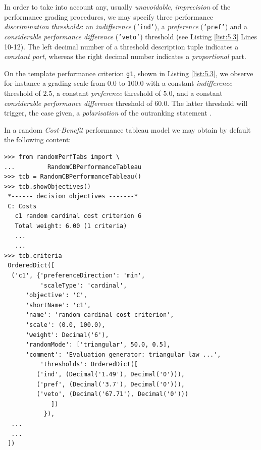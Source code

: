 In order to take into account any, usually \emph{unavoidable}, \emph{imprecision} of the performance grading procedures, we may specify three performance \emph{discrimination thresholds}: an \emph{indifference} (\texttt{'ind'}), a \emph{preference} (\texttt{'pref'}) and a \emph{considerable performance difference} (\texttt{'veto'}) threshold (see Listing \ref{list:5.3} Lines 10-12). The left decimal number of a threshold description tuple indicates a \emph{constant part}, whereas the right decimal number indicates a \emph{proportional} part.

On the template performance criterion \texttt{g1}, shown in Listing \ref{list:5.3}, we observe for instance a grading scale from $0.0$ to $100.0$ with a constant \emph{indifference} threshold of $2.5$, a constant \emph{preference} threshold of $5.0$, and a constant \emph{considerable performance difference} threshold of $60.0$. The latter threshold  will trigger, the case given, a \emph{polarisation} of the outranking statement \citep{BIS-2013}.

In a random \emph{Cost-Benefit} performance tableau model we may obtain by default the following content:
\begin{lstlisting}[caption={Example of cardinal Costs criterion},label=list:5.4]
>>> from randomPerfTabs import \
...         RandomCBPerformanceTableau
>>> tcb = RandomCBPerformanceTableau()
>>> tcb.showObjectives()
 *------ decision objectives -------*
 C: Costs
   c1 random cardinal cost criterion 6
   Total weight: 6.00 (1 criteria)
   ...
   ...
>>> tcb.criteria
 OrderedDict([
  ('c1', {'preferenceDirection': 'min',
          'scaleType': 'cardinal',
	  'objective': 'C',
	  'shortName': 'c1',
	  'name': 'random cardinal cost criterion',
	  'scale': (0.0, 100.0),
	  'weight': Decimal('6'),
	  'randomMode': ['triangular', 50.0, 0.5],
	  'comment': 'Evaluation generator: triangular law ...',
          'thresholds': OrderedDict([
	     ('ind', (Decimal('1.49'), Decimal('0'))),
	     ('pref', (Decimal('3.7'), Decimal('0'))),
	     ('veto', (Decimal('67.71'), Decimal('0')))
             ])
           }),
  ...
  ...
 ])
\end{lstlisting}

